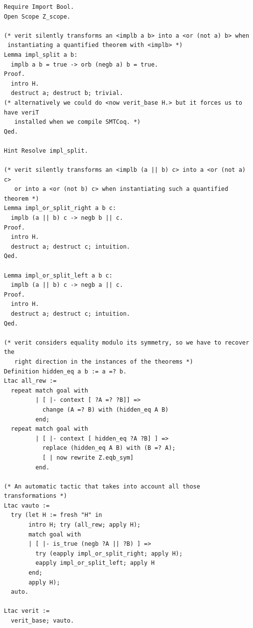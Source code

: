 \documentclass[11pt]{article}
\begin{document}
\begin{lstlisting}[frame=single]
Require Import Bool.
Open Scope Z_scope.

(* verit silently transforms an <implb a b> into a <or (not a) b> when
 instantiating a quantified theorem with <implb> *)
Lemma impl_split a b:
  implb a b = true -> orb (negb a) b = true.
Proof.
  intro H.
  destruct a; destruct b; trivial.
(* alternatively we could do <now verit_base H.> but it forces us to have veriT
   installed when we compile SMTCoq. *)
Qed.

Hint Resolve impl_split.

(* verit silently transforms an <implb (a || b) c> into a <or (not a) c> 
   or into a <or (not b) c> when instantiating such a quantified theorem *)
Lemma impl_or_split_right a b c:
  implb (a || b) c -> negb b || c.
Proof.
  intro H.
  destruct a; destruct c; intuition. 
Qed.

Lemma impl_or_split_left a b c:
  implb (a || b) c -> negb a || c.
Proof.
  intro H.
  destruct a; destruct c; intuition.
Qed.

(* verit considers equality modulo its symmetry, so we have to recover the
   right direction in the instances of the theorems *)
Definition hidden_eq a b := a =? b.
Ltac all_rew :=
  repeat match goal with
         | [ |- context [ ?A =? ?B]] =>
           change (A =? B) with (hidden_eq A B)
         end;
  repeat match goal with
         | [ |- context [ hidden_eq ?A ?B] ] =>
           replace (hidden_eq A B) with (B =? A);
           [ | now rewrite Z.eqb_sym]
         end.

(* An automatic tactic that takes into account all those transformations *)
Ltac vauto :=
  try (let H := fresh "H" in
       intro H; try (all_rew; apply H);
       match goal with
       | [ |- is_true (negb ?A || ?B) ] =>
         try (eapply impl_or_split_right; apply H);
         eapply impl_or_split_left; apply H
       end;
       apply H);
  auto.

Ltac verit :=
  verit_base; vauto.
\end{lstlisting}
\end{document}
